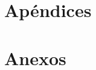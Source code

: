 \documentclass[letterpaper,11pt]{upiita}
\begin{document}

\setcounter{secnumdepth}{-1}

\newpage
{}
\backmatter
\part{Apéndices}
\appendix



\part{Anexos}
\anexo

%
%
\IndiceAlfabetico
\end{document}
